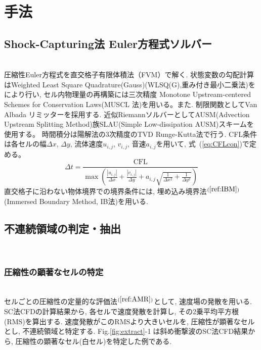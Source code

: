 \documentclass[a4j]{jarticle}
\begin{document}
\section{手法} \label{sec:method}

\subsection{Shock-Capturing法 Euler方程式ソルバー} \label{subsec:sc}
\mbox{}\\[-3.0ex]

圧縮性Euler方程式を直交格子有限体積法（FVM）で解く.
状態変数の勾配計算はWeighted Least Square Quadrature(Gauss)(WLSQ(G),重み付き最小二乗法)をにより行い, セル内物理量の再構築には三次精度 Monotone Upstream-centered
Schemes for Conservation Laws(MUSCL 法)を用いる。また. 制限関数としてVan Albada リミッターを採用する.
近似RiemannソルバーとしてAUSM(Advection Upstream Splitting Method)族SLAU(Simple Low-dissipation AUSM)スキームを使用する。
時間積分は陽解法の3次精度のTVD Runge-Kutta法で行う.
CFL条件は各セルの幅$\Delta x$, $\Delta y$, 流体速度$u_{i,j}$, $v_{i,j}$, 音速$a_{i, j}$を用いて, 式~(\ref{eq:CFLcon})で定める。
\begin{equation}
    \Delta t =
    \frac{\mathrm{CFL}}{
        \max\left(
            \frac{|u_{i,j}|}{\Delta x}
            + \frac{|v_{i,j}|}{\Delta y}
            + a_{i,j}
              \sqrt{
                \frac{1}{\Delta x^2}
                + \frac{1}{\Delta y^2}
              }
        \right)
    }
    \label{eq:CFLcon}
\end{equation}
直交格子に沿わない物体境界での境界条件には, 埋め込み境界法$^{(\ref{ref:IBM})}$(Immersed Boundary Method, IB法)を用いる.

\subsection{不連続領域の判定・抽出} \label{subsec:discon}
\mbox{}\\[-6.0ex]
\subsubsection{圧縮性の顕著なセルの特定} \label{subsubsec:comp}
\mbox{}\\[-1.0ex]

セルごとの圧縮性の定量的な評価法$^{(\ref{ref:AMR})}$として, 速度場の発散を用いる.
SC法CFDの計算結果から, 各セルで速度発散を計算し, その2乗平均平方根(RMS)を算出する.
速度発散がこのRMSより大きいセルを, 圧縮性が顕著なセルとし, 不連続領域と特定する.
Fig.\ref{fig:extract}-\textcircled{\scriptsize 1}は斜め衝撃波のSC法CFD結果から, 圧縮性の顕著なセル(白セル)を特定した例である.
\end{document}
